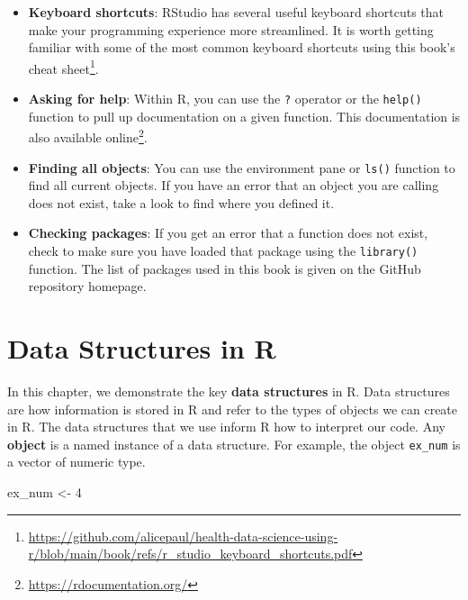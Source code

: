 \documentclass[
  letterpaper,
]{latex/krantz}
\makeatletter
\newenvironment{Shaded}{\begin{snugshade}}{\end{snugshade}}
\newcommand{\DecValTok}[1]{\textcolor[rgb]{0.68,0.00,0.00}{#1}}
\newcommand{\NormalTok}[1]{\textcolor[rgb]{0.00,0.23,0.31}{#1}}
\newcommand{\OtherTok}[1]{\textcolor[rgb]{0.00,0.23,0.31}{#1}}
\renewcommand{\href}[2]{#2\footnote{\url{#1}}}
\newenvironment{kframe}{%
\medskip{}
\setlength{\fboxsep}{.8em}
 \def\at@end@of@kframe{}%
 \ifinner\ifhmode%
  \def\at@end@of@kframe{\end{minipage}}%
  \begin{minipage}{\columnwidth}%
 \fi\fi%
 \def\FrameCommand##1{\hskip\@totalleftmargin \hskip-\fboxsep
 \colorbox{shadecolor}{##1}\hskip-\fboxsep
     \hskip-\linewidth \hskip-\@totalleftmargin \hskip\columnwidth}%
 \MakeFramed {\advance\hsize-\width
   \@totalleftmargin\z@ \linewidth\hsize
   \@setminipage}}%
 {\par\unskip\endMakeFramed%
 \at@end@of@kframe}
\renewenvironment{Shaded}{\begin{kframe}}{\end{kframe}}
\makeatother
\begin{document}
\begin{itemize}
\item
  \textbf{Keyboard shortcuts}: RStudio has several useful keyboard
  shortcuts that make your programming experience more streamlined. It
  is worth getting familiar with some of the most common keyboard
  shortcuts using this book's
  \href{https://github.com/alicepaul/health-data-science-using-r/blob/main/book/refs/r_studio_keyboard_shortcuts.pdf}{cheat
  sheet}.
\item
  \textbf{Asking for help}: Within R, you can use the \texttt{?}
  operator or the \texttt{help()}
   function to pull up
  documentation on a given function. This documentation is also
  available \href{https://rdocumentation.org/}{online}.
\item
  \textbf{Finding all objects}: You can use the environment pane or
  \texttt{ls()}  function to find
  all current objects. If you have an error that an object you are
  calling does not exist, take a look to find where you defined it.
\item
  \textbf{Checking packages}: If you get an error that a function does
  not exist, check to make sure you have loaded that package using the
  \texttt{library()} function. The list of packages used in this book is
  given on the GitHub repository homepage.
\end{itemize}

\chapter{Data Structures in R}\label{sec-data-structures}

In this chapter, we demonstrate the key \textbf{data
structures} in R. Data structures are how
information is stored in R and refer to the types of objects we can
create in R. The data structures that we use inform R how to interpret
our code. Any \textbf{object} is a named instance of a
data structure. For example, the object \texttt{ex\_num} is a vector of
numeric type.

\begin{Shaded}
\begin{Highlighting}[]
\NormalTok{ex\_num }\OtherTok{\textless{}{-}} \DecValTok{4}
\end{Highlighting}
\end{Shaded}
\end{document}
